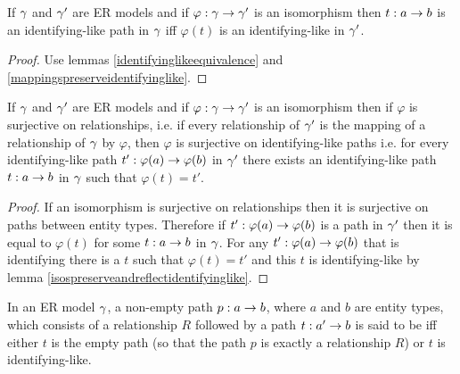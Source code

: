 \begin{lemma}
If $\gamma$ and $\gamma'$ are ER models and if $\varphi:\gamma \rightarrow \gamma'$ is an isomorphism then $t: a  \rightarrow  b$ is an identifying-like path in $\gamma$ iff $\varphi(t)$ is an identifying-like in $\gamma'$.
\end{lemma}
\begin{proof}
Use lemmas \ref{identifyinglikeequivalence} and \ref{mappingspreserveidentifyinglike}.
\end{proof}

\begin{lemma}
If $\gamma$ and $\gamma'$ are ER models and if $\varphi:\gamma \rightarrow \gamma'$ is an isomorphism then if $\varphi$ is 
surjective on relationships, i.e. if every relationship of $\gamma'$ is the mapping of a relationship of $\gamma$ by  $\varphi$,
then $\varphi$ is surjective on identifying-like paths i.e. for every identifying-like path $t': \varphi(a) \rightarrow \varphi(b)$
in $\gamma'$ there exists an identifying-like path $t: a \rightarrow b$ in $\gamma$ such that $\varphi(t)=t'$. 
\end{lemma}
\begin{proof}
If an isomorphism is surjective on relationships then it is surjective on paths between entity types.
Therefore if $t':\varphi(a) \rightarrow \varphi(b)$ is a path in $\gamma'$ then it is equal to $\varphi(t)$ for some
$t: a \rightarrow b$ in $\gamma$. For any $t':\varphi(a) \rightarrow \varphi(b)$ that is identifying there is a $t$ such that 
$\varphi(t)=t'$ and this $t$ is identifying-like by lemma \ref{isospreserveandreflectidentifyinglike}.  
\end{proof}

\begin{definition}
In an ER model $\gamma$, a non-empty path $p: a \rightarrow b$, where $a$ and $b$ are entity types, which consists
of a relationship $R$ followed by a  path $t :a' \rightarrow b$ is said to be  iff
either  $t$ is the empty path (so that the path $p$ is exactly a relationship $R$) or $t$
is identifying-like.
\end{definition}

